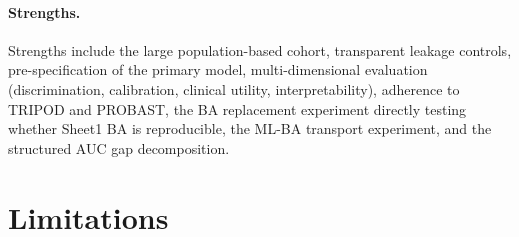 \documentclass[11pt,a4paper]{article}
\begin{document}
\paragraph{Strengths.}
Strengths include the large population-based cohort, transparent leakage controls,
pre-specification of the primary model, multi-dimensional evaluation (discrimination,
calibration, clinical utility, interpretability), adherence to TRIPOD and PROBAST,
the BA replacement experiment directly testing whether Sheet1 BA is reproducible,
the ML-BA transport experiment, and the structured AUC gap decomposition.

\section{Limitations}
\end{document}
